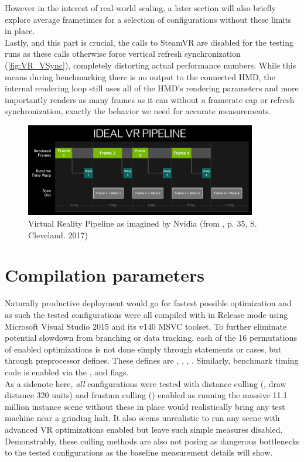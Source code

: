 However in the interest of real-world scaling, a later section will also briefly explore average frametimes for a selection of configurations without these limits in place. \\
Lastly, and this part is crucial, the  calls to SteamVR are disabled for the testing runs as these calls otherwise force vertical refresh synchronization (\autoref{fig:VR_VSync}), completely distorting actual performance numbers. While this means during benchmarking there is no output to the connected HMD, the internal rendering loop still uses all of the HMD's rendering parameters and more importantly renders as many frames as it can without a framerate cap or refresh synchronization, exactly the behavior we need for accurate measurements. 

\begin{figure}[htb]
  \centering
  \includegraphics[width=0.9\textwidth]{pictures/Nvidia_FCAT}
  \caption{Virtual Reality Pipeline as imagined by Nvidia (from \cite{Cleveland.2017}, p. 35, S. Cleveland. 2017)} \label{fig:VR_VSync}
\end{figure} 

\section{Compilation parameters}
Naturally productive deployment would go for fastest possible optimization and as such the tested configurations were all compiled with  in Release mode using Microsoft Visual Studio 2015 and its v140 MSVC toolset. 
To further eliminate potential slowdown from branching or data tracking, each of the 16 permutations of enabled optimizations is not done simply through  statements or  cases, but through preprocessor defines. These defines are , , , . Similarly, benchmark timing code is enabled via the ,  and  flags. \\
As a sidenote here, \textit{all} configurations were tested with distance culling (, draw distance 320 units) and frustum culling () enabled as running the massive 11.1 million instance scene without these in place would realistically bring any test machine near a grinding halt. It also seems unrealistic to run any scene with advanced VR optimizations enabled but leave such simple measures disabled. 
Demonstrably, these culling methods are also not posing as dangerous bottlenecks to the tested configurations as the baseline measurement details will show. 

